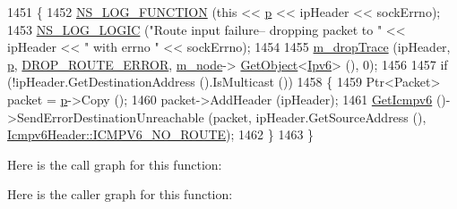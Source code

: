 \begin{DoxyCode}
1451 \{
1452   \hyperlink{log-macros-disabled_8h_a90b90d5bad1f39cb1b64923ea94c0761}{NS\_LOG\_FUNCTION} (\textcolor{keyword}{this} << \hyperlink{lte__link__budget_8m_ac9de518908a968428863f829398a4e62}{p} << ipHeader << sockErrno);
1453   \hyperlink{group__logging_ga88acd260151caf2db9c0fc84997f45ce}{NS\_LOG\_LOGIC} (\textcolor{stringliteral}{"Route input failure-- dropping packet to "} << ipHeader << \textcolor{stringliteral}{" with errno "} << 
      sockErrno);
1454 
1455   \hyperlink{classns3_1_1Ipv6L3Protocol_ac22d2d63cac436267ae6cafc46880a6e}{m\_dropTrace} (ipHeader, \hyperlink{lte__link__budget_8m_ac9de518908a968428863f829398a4e62}{p}, \hyperlink{classns3_1_1Ipv6L3Protocol_a33c64db9bc35f71ff368b132bfffa37aa3690e9264e4d2307050512b833df4946}{DROP\_ROUTE\_ERROR}, \hyperlink{classns3_1_1Ipv6L3Protocol_a543d8509395ee76de15d039ff1fce642}{m\_node}->
      \hyperlink{classns3_1_1Object_a13e18c00017096c8381eb651d5bd0783}{GetObject}<\hyperlink{classns3_1_1Ipv6_adccc58acd14d3f9a28f75dc09e794998}{Ipv6}> (), 0);
1456 
1457   \textcolor{keywordflow}{if} (!ipHeader.GetDestinationAddress ().IsMulticast ())
1458     \{
1459       Ptr<Packet> packet = \hyperlink{lte__link__budget_8m_ac9de518908a968428863f829398a4e62}{p}->Copy ();
1460       packet->AddHeader (ipHeader);
1461       \hyperlink{classns3_1_1Ipv6L3Protocol_a10384a4dc85c61e65cf73b47ec9da90d}{GetIcmpv6} ()->SendErrorDestinationUnreachable (packet, ipHeader.GetSourceAddress (), 
      \hyperlink{classns3_1_1Icmpv6Header_a2609b9581c3de3d6bbf8d55f5adf0d1da87eecfb727188f14485806388ca7839a}{Icmpv6Header::ICMPV6\_NO\_ROUTE});
1462     \}
1463 \}
\end{DoxyCode}


Here is the call graph for this function\+:




Here is the caller graph for this function\+:


